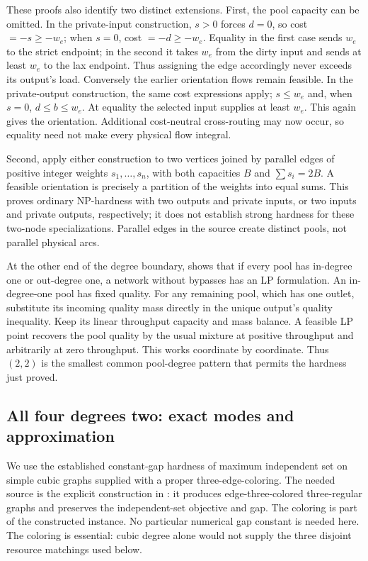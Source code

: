 These proofs also identify two distinct extensions. First, the pool
capacity can be omitted. In the private-input construction, $s>0$
forces $d=0$, so cost $=-s\ge-w_e$; when $s=0$, cost $=-d\ge-w_e$.
Equality in the first case sends $w_e$ to the strict endpoint; in the
second it takes $w_e$ from the dirty input and sends at least $w_e$ to
the lax endpoint. Thus assigning the edge accordingly never exceeds
its output's load. Conversely the earlier orientation flows remain
feasible. In the private-output construction, the same cost expressions
apply; $s\le w_e$ and, when $s=0$, $d\le b\le w_e$. At equality the
selected input supplies at least $w_e$. This again gives the orientation.
Additional cost-neutral cross-routing may now occur, so equality need
not make every physical flow integral.

Second, apply either construction to two vertices joined by parallel
edges of positive integer weights $s_1,\ldots,s_n$, with both capacities
$B$ and $\sum s_i=2B$. A feasible orientation is precisely a partition
of the weights into equal sums. This proves ordinary NP-hardness with
two outputs and private inputs, or two inputs and private outputs,
respectively; it does not establish strong hardness for these two-node
specializations. Parallel edges in the source create distinct pools,
not parallel physical arcs.

At the other end of the degree boundary,
\citet[Proposition~3]{haugland2016-the-computational-complexity-of-the}
shows that if every pool has in-degree one or out-degree one, a network
without bypasses has an LP formulation.
An in-degree-one pool has fixed quality. For any remaining pool, which
has one outlet, substitute its incoming quality mass directly in the
unique output's quality inequality. Keep its linear throughput capacity
and mass balance. A feasible LP point recovers the pool quality by the
usual mixture at positive throughput and arbitrarily at zero throughput.
This works coordinate by coordinate. Thus $(2,2)$ is the smallest common
pool-degree pattern that permits the hardness just proved.

\subsection{All four degrees two: exact modes and approximation}\label{s3:all-two}

We use the established constant-gap hardness of maximum independent set
on simple cubic graphs supplied with a proper three-edge-coloring.
The needed source is the explicit construction in
\citet[author manuscript, Section~5(A), pp.~25--26]{s3:chlebik2006}:
it produces edge-three-colored three-regular graphs and preserves the
independent-set objective and gap. The coloring is part of the constructed
instance. No particular numerical gap constant is needed here. The coloring is
essential: cubic degree alone would not supply the three disjoint
resource matchings used below.


